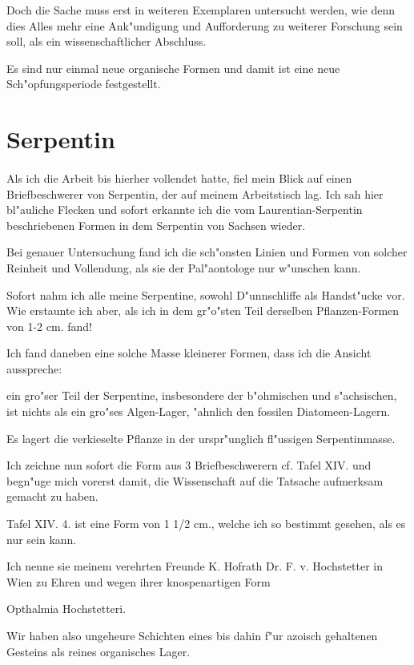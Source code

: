 \documentclass[a4paper, 11pt, oneside, german]{article}
\begin{document}
Doch die Sache muss erst in weiteren Exemplaren untersucht werden, wie denn dies Alles mehr eine Ank"undigung und Aufforderung zu weiterer Forschung sein soll, als ein wissenschaftlicher Abschluss.

Es sind nur einmal neue organische Formen und damit ist eine neue Sch"opfungsperiode festgestellt.
\clearpage
\section{Serpentin}
\paragraph{}
Als ich die Arbeit bis hierher vollendet hatte, fiel mein Blick auf einen Briefbeschwerer von Serpentin, der auf meinem Arbeitstisch lag. Ich sah hier bl"auliche Flecken und sofort erkannte ich die vom Laurentian-Serpentin beschriebenen Formen in dem Serpentin von Sachsen wieder.

Bei genauer Untersuchung fand ich die sch"onsten Linien und Formen von solcher Reinheit und Vollendung, als sie der Pal"aontologe nur w"unschen kann.

Sofort nahm ich alle meine Serpentine, sowohl D"unnschliffe als Handst"ucke vor. Wie erstaunte ich aber, als ich in dem gr"o"sten Teil derselben Pflanzen-Formen von 1-2 cm. fand!

Ich fand daneben eine solche Masse kleinerer Formen, dass ich die Ansicht ausspreche:

ein gro"ser Teil der Serpentine, insbesondere der b"ohmischen und s"achsischen, ist nichts als ein gro"ses Algen-Lager, "ahnlich den fossilen Diatomeen-Lagern.

Es lagert die verkieselte Pflanze in der urspr"unglich fl"ussigen Serpentinmasse.

Ich zeichne nun sofort die Form aus 3 Briefbeschwerern cf. Tafel XIV. und begn"uge mich vorerst damit, die Wissenschaft auf die Tatsache aufmerksam gemacht zu haben.

Tafel XIV. 4. ist eine Form von 1 1/2 cm., welche ich so bestimmt gesehen, als es nur sein kann.

Ich nenne sie meinem verehrten Freunde K. Hofrath Dr. F. v. Hochstetter in Wien zu Ehren und wegen ihrer knospenartigen Form

Opthalmia Hochstetteri.

Wir haben also ungeheure Schichten eines bis dahin f"ur azoisch gehaltenen Gesteins als reines organisches Lager.
\end{document}
